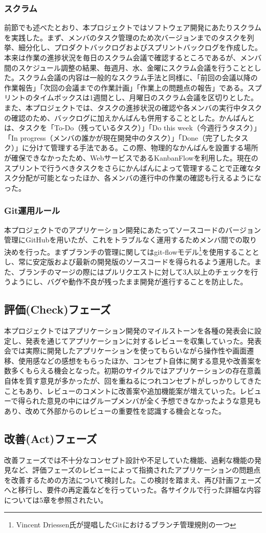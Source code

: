 \subsubsection{スクラム}
前節でも述べたとおり、本プロジェクトではソフトウェア開発にあたりスクラムを実践した。まず、メンバのタスク管理のため次バージョンまでのタスクを列挙、細分化し、プロダクトバックログおよびスプリントバックログを作成した。本来は作業の進捗状況を毎日のスクラム会議で確認するところであるが、メンバ間のスケジュール調整の結果、毎週月、水、金曜にスクラム会議を行うこととした。スクラム会議の内容は一般的なスクラム手法と同様に、「前回の会議以降の作業報告」「次回の会議までの作業計画」「作業上の問題点の報告」である。スプリントのタイムボックスは1週間とし、月曜日のスクラム会議を区切りとした。また、本プロジェクトでは、タスクの進捗状況の確認や各メンバの実行中タスクの確認のため、バックログに加えかんばんも併用することとした。かんばんとは、タスクを「To-Do（残っているタスク）」「Do this week（今週行うタスク）」「In progress（メンバの誰かが現在開発中のタスク）」「Done（完了したタスク）」に分けて管理する手法である。この際、物理的なかんばんを設置する場所が確保できなかったため、WebサービスであるKanbanFlowを利用した。現在のスプリントで行うべきタスクをさらにかんばんによって管理することで正確なタスク分配が可能となったほか、各メンバの進行中の作業の確認も行えるようになった。
\subsubsection{Git運用ルール}
本プロジェクトでのアプリケーション開発にあたってソースコードのバージョン管理にGitHubを用いたが、これをトラブルなく運用するためメンバ間での取り決めを行った。まずブランチの管理に関してはgit-flowモデル\footnote{Vincent Driessen氏が提唱したGitにおけるブランチ管理規則の一つ\cite{GITFLOW}}を使用することとし、常に安定版および最新の開発版のソースコードを得られるよう運用した。また、ブランチのマージの際にはプルリクエストに対して3人以上のチェックを行うようにし、バグや動作不良が残ったまま開発が進行することを防止した。
\subsection{評価(Check)フェーズ}
本プロジェクトではアプリケーション開発のマイルストーンを各種の発表会に設定し、発表を通じてアプリケーションに対するレビューを収集していった。発表会では実際に開発したアプリケーションを使ってもらいながら操作性や画面遷移、使用感などの感想をもらったほか、コンセプト自体に関する意見や改善案を数多くもらえる機会となった。初期のサイクルではアプリケーションの存在意義自体を質す意見が多かったが、回を重ねるにつれコンセプトがしっかりしてきたこともあり、レビューのコメントに改善案や追加機能案が増えていった。レビューで得られた意見の中にはグループメンバが全く予想できなかったような意見もあり、改めて外部からのレビューの重要性を認識する機会となった。
\subsection{改善(Act)フェーズ}
改善フェーズでは不十分なコンセプト設計や不足していた機能、過剰な機能の発見など、評価フェーズのレビューによって指摘されたアプリケーションの問題点を改善するための方法について検討した。この検討を踏まえ、再び計画フェーズへと移行し、要件の再定義などを行っていった。各サイクルで行った詳細な内容については5章を参照されたい。

